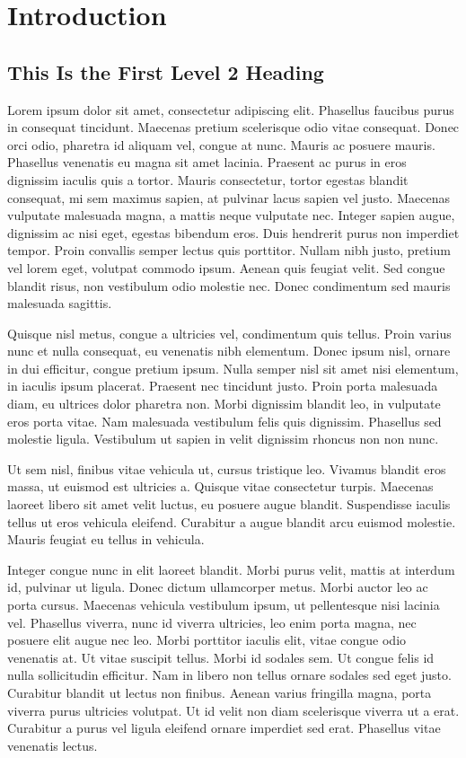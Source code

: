 \section{Introduction}

\subsection{This Is the First Level 2 Heading}



Lorem ipsum dolor sit amet, consectetur adipiscing elit. Phasellus faucibus purus in consequat tincidunt. Maecenas pretium scelerisque odio vitae consequat. Donec orci odio, pharetra id aliquam vel, congue at nunc. Mauris ac posuere mauris. Phasellus venenatis eu magna sit amet lacinia. Praesent ac purus in eros dignissim iaculis quis a tortor. Mauris consectetur, tortor egestas blandit consequat, mi sem maximus sapien, at pulvinar lacus sapien vel justo. Maecenas vulputate malesuada magna, a mattis neque vulputate nec. Integer sapien augue, dignissim ac nisi eget, egestas bibendum eros. Duis hendrerit purus non imperdiet tempor. Proin convallis semper lectus quis porttitor. Nullam nibh justo, pretium vel lorem eget, volutpat commodo ipsum. Aenean quis feugiat velit. Sed congue blandit risus, non vestibulum odio molestie nec. Donec condimentum sed mauris malesuada sagittis.

Quisque nisl metus, congue a ultricies vel, condimentum quis tellus. Proin varius nunc et nulla consequat, eu venenatis nibh elementum. Donec ipsum nisl, ornare in dui efficitur, congue pretium ipsum. Nulla semper nisl sit amet nisi elementum, in iaculis ipsum placerat. Praesent nec tincidunt justo. Proin porta malesuada diam, eu ultrices dolor pharetra non. Morbi dignissim blandit leo, in vulputate eros porta vitae. Nam malesuada vestibulum felis quis dignissim. Phasellus sed molestie ligula. Vestibulum ut sapien in velit dignissim rhoncus non non nunc.

Ut sem nisl, finibus vitae vehicula ut, cursus tristique leo. Vivamus blandit eros massa, ut euismod est ultricies a. Quisque vitae consectetur turpis. Maecenas laoreet libero sit amet velit luctus, eu posuere augue blandit. Suspendisse iaculis tellus ut eros vehicula eleifend. Curabitur a augue blandit arcu euismod molestie. Mauris feugiat eu tellus in vehicula.

Integer congue nunc in elit laoreet blandit. Morbi purus velit, mattis at interdum id, pulvinar ut ligula. Donec dictum ullamcorper metus. Morbi auctor leo ac porta cursus. Maecenas vehicula vestibulum ipsum, ut pellentesque nisi lacinia vel. Phasellus viverra, nunc id viverra ultricies, leo enim porta magna, nec posuere elit augue nec leo. Morbi porttitor iaculis elit, vitae congue odio venenatis at. Ut vitae suscipit tellus. Morbi id sodales sem. Ut congue felis id nulla sollicitudin efficitur. Nam in libero non tellus ornare sodales sed eget justo. Curabitur blandit ut lectus non finibus. Aenean varius fringilla magna, porta viverra purus ultricies volutpat. Ut id velit non diam scelerisque viverra ut a erat. Curabitur a purus vel ligula eleifend ornare imperdiet sed erat. Phasellus vitae venenatis lectus.

